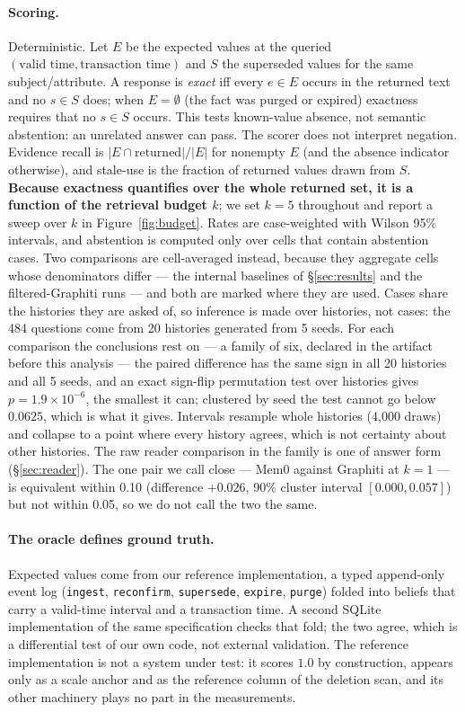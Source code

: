 \documentclass[conference]{IEEEtran}
\begin{document}
\paragraph{Scoring.} Deterministic. Let $E$ be the expected values at the queried
$(\text{valid time}, \text{transaction time})$ and $S$ the superseded values for
the same subject/attribute. A response is \emph{exact} iff every $e \in E$ occurs
in the returned text and no $s \in S$ does; when $E = \emptyset$ (the fact was
purged or expired) exactness requires that no $s \in S$ occurs. This tests
known-value absence, not semantic abstention: an unrelated answer can pass.
The scorer does not interpret negation. Evidence recall is $|E \cap \text{returned}| / |E|$ for nonempty $E$
(and the absence indicator otherwise), and stale-use is
the fraction of returned values drawn from $S$. \textbf{Because exactness
quantifies over the whole returned set, it is a function of the retrieval budget
$k$}; we set $k{=}5$ throughout and report a sweep over $k$ in
Figure~\ref{fig:budget}. Rates are case-weighted with Wilson 95\% intervals, and
abstention is computed only over cells that contain abstention cases. Two
comparisons are cell-averaged instead, because they aggregate cells whose
denominators differ --- the internal baselines of \S\ref{sec:results} and
the filtered-Graphiti runs --- and both are marked where they are used.
Cases share the histories they are asked of, so inference is made over
histories, not cases: the 484 questions come from 20 histories generated from 5
seeds. For each comparison the conclusions rest on --- a family of six, declared
in the artifact before this analysis --- the paired difference has the same sign
in all 20 histories and all 5 seeds, and an exact sign-flip permutation test over
histories gives $p = 1.9 \times 10^{-6}$, the smallest it can; clustered by seed
the test cannot go below $0.0625$, which is what it gives. Intervals resample
whole histories (4{,}000 draws) and collapse to a point where every history
agrees, which is not certainty about other histories. The raw reader comparison
in the family is one of answer form (\S\ref{sec:reader}). The one pair we call
close --- Mem0 against Graphiti at $k{=}1$ --- is equivalent within 0.10
(difference $+0.026$, 90\% cluster interval $[0.000, 0.057]$) but not within
0.05, so we do not call the two the same.

\paragraph{The oracle defines ground truth.} Expected values come from our
reference implementation, a typed append-only event log (\texttt{ingest},
\texttt{reconfirm}, \texttt{supersede}, \texttt{expire}, \texttt{purge}) folded
into beliefs that carry a valid-time interval and a transaction time. A second
SQLite implementation of the same specification checks that fold; the two agree,
which is a differential test of our own code, not external validation. The
reference implementation is not a system under test: it scores $1.0$ by
construction, appears only as a scale anchor and as the reference column of the
deletion scan, and its other machinery plays no part in the measurements.
\end{document}
